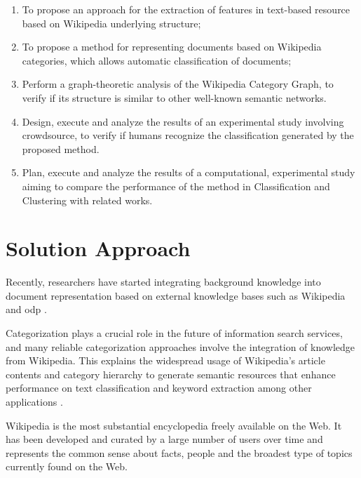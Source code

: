\begin{enumerate}[i]
\item  To propose an approach for the extraction of features in text-based resource based on Wikipedia underlying structure;

\item To propose a method for representing  documents based on Wikipedia categories, which allows automatic classification of documents;

\item Perform a graph-theoretic analysis of the Wikipedia Category Graph, to verify if its structure is similar to other well-known semantic networks.

\item Design, execute and analyze the results of an experimental study involving crowdsource, to verify if humans recognize the classification 
generated by the proposed method.

\item Plan, execute and analyze the results of a computational, experimental study aiming to compare the performance of the method in Classification and Clustering with related works.

\end{enumerate}

\section{\hspace*{3pt}Solution Approach}

Recently, researchers have started integrating background knowledge into document representation based on external knowledge bases such as Wikipedia and \gls{odp} \cite{rafi2012content}.

Categorization plays a crucial role in the future of information search services, and many reliable categorization approaches involve the integration of knowledge from Wikipedia. This explains the widespread usage of Wikipedia’s article contents and category hierarchy to generate semantic resources that enhance performance on text classification and keyword extraction among other applications \cite{gantner2009automatic}. 

Wikipedia is the most substantial encyclopedia freely available on the Web. It has been developed and curated by a large number of users over time and represents the common sense about facts, people and the broadest type of topics currently found on the Web.

